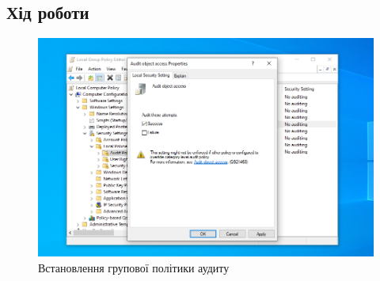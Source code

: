 \documentclass[oneside,14pt]{extarticle}
\begin{document}
\begin{normalsize}
	\section*{Хід роботи}
	
	\begin{figure}[H]
		\centering
		\includegraphics[width=\columnwidth]{1}
		\caption{Встановлення групової політики аудиту}
	\end{figure}
	

\end{normalsize}
\end{document}
